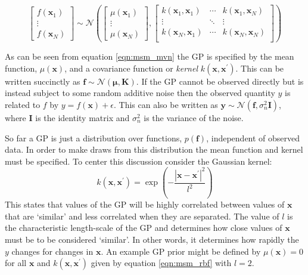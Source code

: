 \begin{equation}
\begin{bmatrix}  f\left(\mathbf{x}_{1}\right) \\ \vdots \\ f\left(\mathbf{x}_{N}\right) \end{bmatrix} 
\sim 
\mathcal{N}\left( 
\begin{bmatrix} \mu\left(\mathbf{x}_{1}\right) \\  \vdots \\ \mu\left(\mathbf{x}_{N}\right) \end{bmatrix}, 
\begin{bmatrix}
k(\mathbf{x}_{1}, \mathbf{x}_{1}) & \cdots & k(\mathbf{x}_{1}, \mathbf{x}_{N}) \\
\vdots & \ddots & \vdots \\
k(\mathbf{x}_{N}, \mathbf{x}_{1}) & \cdots & k(\mathbf{x}_{N}, \mathbf{x}_{N}) \\
\end{bmatrix}
\right)
\end{equation}\label{eqn:msm_mvn}

As can be seen from equation \ref{eqn:msm_mvn} the GP is specified by the mean function, $\mu(\mathbf{x})$, and a covariance function or \emph{kernel} $k(\mathbf{x}, \mathbf{x}^{\prime})$. This can be written succinctly as $\mathbf{f} \sim \mathcal{N}(\bm{\mu}, \mathbf{K})$. \cite{rasmussenGaussianProcessesMachine2006} If the GP cannot be observed directly but is instead subject to some random additive noise then the observed quantity $y$ is related to $f$ by $y = f(\mathbf{x}) + \epsilon$. This can also be written as $\mathbf{y} \sim \mathcal{N}(\mathbf{f}, \sigma_{n}^{2}\mathbf{I})$, where $\mathbf{I}$ is the identity matrix and $\sigma_{n}^{2}$ is the variance of the noise. \cite{rasmussenGaussianProcessesMachine2006} 

So far a GP is just a distribution over functions, $p(\mathbf{f})$, independent of observed data. In order to make draws from this distribution the mean function and kernel must be specified. To center this discussion consider the Gaussian kernel: 
\begin{equation}
    k(\mathbf{x}, \mathbf{x}^{\prime}) = \exp{\left(-\frac{\left|\mathbf{x}-\mathbf{x}^{\prime}\right|^{2}}{l^{2}}\right)}
\end{equation}\label{eqn:msm_rbf}
This states that values of the GP will be highly correlated between values of $\mathbf{x}$ that are `similar' and less correlated when they are separated. The value of $l$ is the characteristic length-scale of the GP and determines how close values of $\mathbf{x}$ must be to be considered `similar'.\cite{rasmussenGaussianProcessesMachine2006} In other words, it determines how rapidly the $y$ changes for changes in $\mathbf{x}$. An example GP prior might be defined by $\mu(\mathbf{x})=0$ for all $\mathbf{x}$ and $k(\mathbf{x}, \mathbf{x}^{\prime})$ given by equation \ref{eqn:msm_rbf} with $l=2$.  

